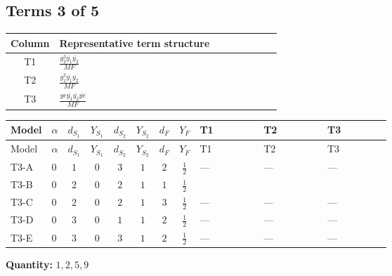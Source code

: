 \documentclass[8pt]{article}
\begin{document}
\begin{landscape}
\subsection*{Terms 3 of 5}
\begin{center}
\begin{tabular}{@{}c >{\raggedright\arraybackslash}p{0.82\linewidth}@{}}
\toprule
Column & Representative term structure \\
\midrule
T1 & \(\displaystyle \frac{g_{2}^{2} \overline{y_{1}} \overline{y_{2}}}{MF}\) \\
\midrule
T2 & \(\displaystyle \frac{g_{1}^{2} \overline{y_{1}} \overline{y_{2}}}{MF}\) \\
\midrule
T3 & \(\displaystyle \frac{ye \overline{y_{1}} \overline{y_{2}} \overline{ye}}{MF}\) \\
\midrule
\bottomrule
\end{tabular}
\end{center}
\smallskip
\tiny
\begin{longtable}{@{}llcccccc >{\raggedright\arraybackslash}p{0.21\linewidth} >{\raggedright\arraybackslash}p{0.21\linewidth} >{\raggedright\arraybackslash}p{0.21\linewidth}@{}}
\toprule
Model & $\alpha$ & $d_{S_1}$ & $Y_{S_1}$ & $d_{S_2}$ & $Y_{S_2}$ & $d_F$ & $Y_F$ & T1 & T2 & T3 \\
\midrule
\endfirsthead
\toprule
Model & $\alpha$ & $d_{S_1}$ & $Y_{S_1}$ & $d_{S_2}$ & $Y_{S_2}$ & $d_F$ & $Y_F$ & T1 & T2 & T3 \\
\midrule
\endhead
T3-A & $0$ & $1$ & $0$ & $3$ & $1$ & $2$ & $\frac{1}{2}$ & --- & --- & --- \\
\midrule
T3-B & $0$ & $2$ & $0$ & $2$ & $1$ & $1$ & $\frac{1}{2}$ & \scriptsize\adjustbox{max width=\linewidth}{$\begin{gathered} \frac{3 g_{2}^{2} \overline{y_{1}} \overline{y_{2}}}{8 MF}\end{gathered}$} & \scriptsize\adjustbox{max width=\linewidth}{$\begin{gathered} \frac{3 g_{1}^{2} \overline{y_{1}} \overline{y_{2}}}{16 MF}\end{gathered}$} & \scriptsize\adjustbox{max width=\linewidth}{$\begin{gathered} - \frac{ye \overline{y_{1}} \overline{y_{2}} \overline{ye}}{8 MF}\end{gathered}$} \\
\midrule
T3-C & $0$ & $2$ & $0$ & $2$ & $1$ & $3$ & $\frac{1}{2}$ & --- & --- & --- \\
\midrule
T3-D & $0$ & $3$ & $0$ & $1$ & $1$ & $2$ & $\frac{1}{2}$ & --- & --- & --- \\
\midrule
T3-E & $0$ & $3$ & $0$ & $3$ & $1$ & $2$ & $\frac{1}{2}$ & --- & --- & --- \\
\midrule
\bottomrule
\end{longtable}
\clearpage
\noindent\textbf{Quantity: }$\mathrm{1,2,5,9}$\par\smallskip

\end{landscape}
\end{document}
